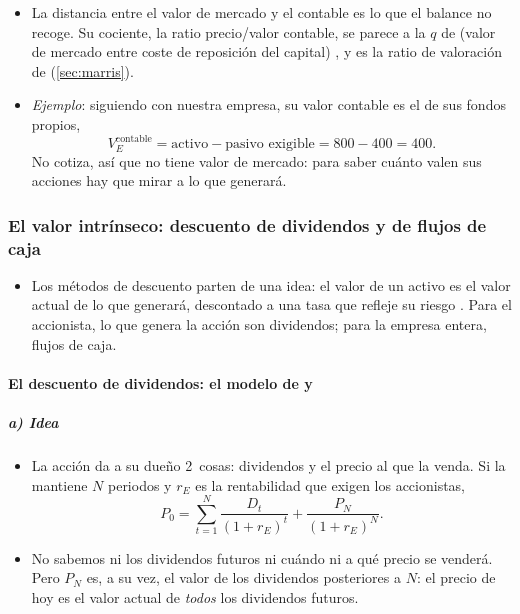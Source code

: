 \documentclass[11pt]{article}
\begin{document}
\begin{itemize}
\begin{itemize}
  \end{itemize}
\item La distancia entre el valor de mercado y el contable es lo que el balance no recoge. Su cociente, la ratio precio/valor contable, se parece a la $q$ de  (valor de mercado entre coste de reposición del capital) , y es la ratio de valoración de  (\ref{sec:marris}).
\item \emph{Ejemplo}: siguiendo con nuestra empresa, su valor contable es el de sus fondos propios,
  \[
  V_E^{\text{contable}}=\text{activo}-\text{pasivo exigible}=800-400=400.
  \]
  No cotiza, así que no tiene valor de mercado: para saber cuánto valen sus acciones hay que mirar a lo que generará.
\end{itemize}

\subsubsection{El valor intrínseco: descuento de dividendos y de flujos de caja}\label{sec:valor-intrinseco}

\begin{itemize}
\item Los métodos de descuento parten de una idea: el valor de un activo es el valor actual de lo que generará, descontado a una tasa que refleje su riesgo . Para el accionista, lo que genera la acción son dividendos; para la empresa entera, flujos de caja.
\end{itemize}

\paragraph{El descuento de dividendos: el modelo de  y }

\subparagraph{a) Idea}

\begin{itemize}
\item La acción da a su dueño 2~cosas: dividendos y el precio al que la venda. Si la mantiene $N$ periodos y $r_E$ es la rentabilidad que exigen los accionistas,
  \[
  P_0=\sum_{t=1}^{N}\frac{D_t}{(1+r_E)^t}+\frac{P_N}{(1+r_E)^N}.
  \]
\item No sabemos ni los dividendos futuros ni cuándo ni a qué precio se venderá. Pero $P_N$ es, a su vez, el valor de los dividendos posteriores a $N$: el precio de hoy es el valor actual de \emph{todos} los dividendos futuros.
\end{itemize}
\end{document}
